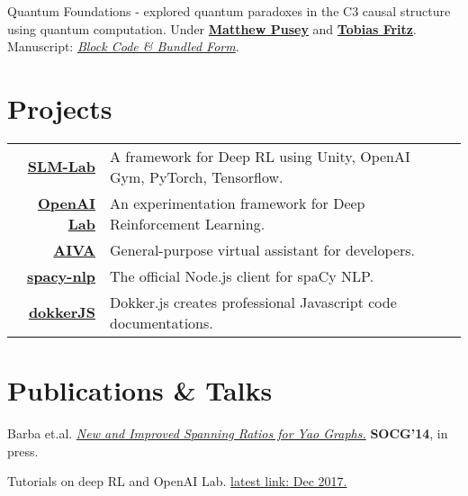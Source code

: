 \documentclass{deedy-resume-openfont}
\begin{document}
\begin{minipage}[t]{0.66\textwidth}
Quantum Foundations - explored quantum paradoxes in the C3 causal structure using quantum computation. Under \textbf{\href{https://www.mattpusey.uk/}{Matthew Pusey}} and \textbf{\href{http://perimeterinstitute.ca/personal/tfritz/}{Tobias Fritz}}. Manuscript: \textit{\href{https://github.com/kengz/Quantum-Foundations-Correlations/blob/master/Keng\%20blockcode.pdf}{Block Code \& Bundled Form}}.
\sectionsep


\section{Projects}
\begin{tabular}{rll}

\href{https://github.com/kengz/SLM-Lab}{\bf SLM-Lab}  & A framework for Deep RL using Unity, OpenAI Gym, PyTorch, Tensorflow.\\
\href{https://github.com/kengz/openai_lab}{\bf OpenAI Lab}  & An experimentation framework for Deep Reinforcement Learning.\\
\href{https://github.com/kengz/aiva}{\bf AIVA}  & General-purpose virtual assistant for developers.\\
\href{https://github.com/kengz/spacy-nlp}{\bf spacy-nlp}  & The official Node.js client for spaCy NLP.\\
\href{https://github.com/kengz/dokker}{\bf dokkerJS}  &  Dokker.js creates professional Javascript code documentations. \\
\end{tabular}
\sectionsep



\section{Publications \& Talks}
\begin{enumerate}[ {[}1{]} ]
\setlength{\itemsep}{0pt}
\setlength{\parskip}{0pt}

\item Barba et.al. \href{http://arxiv.org/pdf/1307.5829.pdf}{\em New and Improved Spanning Ratios for Yao Graphs.} {\bf SOCG'14}, in press.
\item Tutorials on deep RL and OpenAI Lab.  \href{https://insights.untapt.com/openai-lab-for-deep-reinforcement-learning-experimentation-6287867eb611}{latest link: Dec 2017.}
\end{enumerate}
\sectionsep



\end{minipage}
\end{document}
